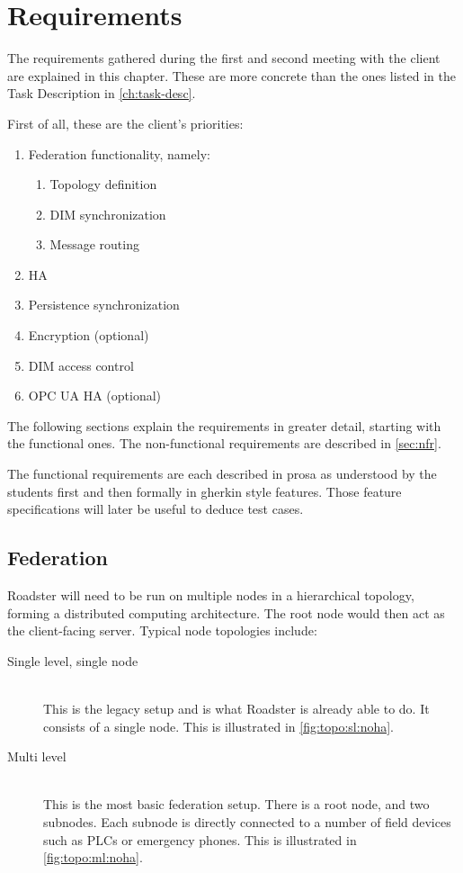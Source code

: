 \chapter{Requirements}\label{ch:reqs}
The requirements gathered during the first and second meeting with the client are
explained in this chapter. These are more concrete than the ones listed in the
Task Description in \autoref{ch:task-desc}.

First of all, these are the client's priorities:

\begin{enumerate}
\item Federation functionality, namely:
	\begin{enumerate}
		\item Topology definition
		\item DIM synchronization
		\item Message routing
	\end{enumerate}
\item \Gls{HA}
\item Persistence synchronization
\item Encryption (optional)
\item DIM access control
\item OPC UA \gls{HA} (optional)
\end{enumerate}

The following sections explain the requirements in greater detail, starting
with the functional ones. The non-functional requirements are described in
\autoref{sec:nfr}.

The functional requirements are each described in prosa as understood by the
students first and then formally in \gls{gherkin} style features. Those feature
specifications will later be useful to deduce test cases.

\section{Federation}
Roadster will need to be run on multiple nodes in a hierarchical topology,
forming a distributed computing architecture. The root node would then act as
the client-facing server. Typical node topologies include:

\begin{description}
	\item [ Single level, single node ] \hfill\\
		This is the legacy setup and is what Roadster is already able
		to do. It consists of a single node. This is illustrated in
		\autoref{fig:topo:sl:noha}.

	\item [ Multi level ] \hfill\\
		This is the most basic federation setup. There is a root node, and
		two subnodes. Each subnode is directly connected to a number of field devices such as
		\glspl{PLC} or emergency phones. This is illustrated in
		\autoref{fig:topo:ml:noha}.
\end{description}

